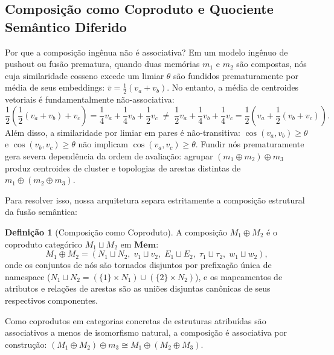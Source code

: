 \documentclass[11pt,a4paper]{article}
\theoremstyle{definition}
\newtheorem{definicao}{Defini\c{c}\~ao}[section]
\begin{document}
\subsection{Composi\c{c}\~ao como Coproduto e Quociente Sem\^antico Diferido}

Por que a composi\c{c}\~ao ing\^enua n\~ao \'e associativa? Em um modelo ing\^enuo de pushout ou fus\~ao prematura, quando duas mem\'orias $m_1$ e $m_2$ s\~ao compostas, n\'os cuja similaridade cosseno excede um limiar $\theta$ s\~ao fundidos prematuramente por m\'edia de seus embeddings: $\bar{v} = \frac{1}{2}(v_a + v_b)$. No entanto, a m\'edia de centroides vetoriais \'e fundamentalmente n\~ao-associativa:
\[
\frac{1}{2}\left(\frac{1}{2}(v_a + v_b) + v_c\right) = \frac{1}{4}v_a + \frac{1}{4}v_b + \frac{1}{2}v_c \;\neq\; \frac{1}{2}v_a + \frac{1}{4}v_b + \frac{1}{4}v_c = \frac{1}{2}\left(v_a + \frac{1}{2}(v_b + v_c)\right).
\]
Al\'em disso, a similaridade por limiar em pares \'e n\~ao-transitiva: $\cos(v_a, v_b) \geq \theta$ e $\cos(v_b, v_c) \geq \theta$ n\~ao implicam $\cos(v_a, v_c) \geq \theta$. Fundir n\'os prematuramente gera severa depend\^encia da ordem de avalia\c{c}\~ao: agrupar $(m_1 \oplus m_2) \oplus m_3$ produz centroides de cluster e topologias de arestas distintas de $m_1 \oplus (m_2 \oplus m_3)$.

Para resolver isso, nossa arquitetura separa estritamente a composi\c{c}\~ao estrutural da fus\~ao sem\^antica:

\begin{definicao}[Composi\c{c}\~ao como Coproduto]
A composi\c{c}\~ao $M_1 \oplus M_2$ \'e o coproduto categ\'orico $M_1 \sqcup M_2$ em $\mathbf{Mem}$:
\[
M_1 \oplus M_2 = (N_1 \sqcup N_2,\; v_1 \sqcup v_2,\; E_1 \sqcup E_2,\; \tau_1 \sqcup \tau_2,\; w_1 \sqcup w_2),
\]
onde os conjuntos de n\'os s\~ao tornados disjuntos por prefixa\c{c}\~ao \'unica de namespace ($N_1 \sqcup N_2 = (\{1\} \times N_1) \cup (\{2\} \times N_2)$), e os mapeamentos de atributos e rela\c{c}\~oes de arestas s\~ao as uni\~oes disjuntas can\^onicas de seus respectivos componentes.
\end{definicao}

Como coprodutos em categorias concretas de estruturas atribu\'idas s\~ao associativos a menos de isomorfismo natural, a composi\c{c}\~ao \'e associativa por constru\c{c}\~ao: $(M_1 \oplus M_2) \oplus m_3 \cong M_1 \oplus (M_2 \oplus M_3)$.
\end{document}
